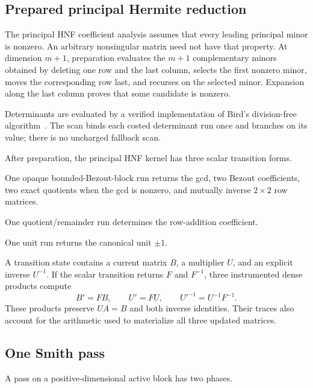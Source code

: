 \documentclass[11pt]{article}
\theoremstyle{definition}
\begin{document}
\subsection{Prepared principal Hermite reduction}

The principal HNF coefficient analysis assumes that every leading principal minor is nonzero.  An arbitrary nonsingular matrix need not have that property.  At dimension $m+1$, preparation evaluates the $m+1$ complementary minors obtained by deleting one row and the last column, selects the first nonzero minor, moves the corresponding row last, and recurses on the selected minor.  Expansion along the last column proves that some candidate is nonzero.

Determinants are evaluated by a verified implementation of Bird's division-free algorithm~\cite{bird2011}.  The scan binds each costed determinant run once and branches on its value; there is no uncharged fallback scan.

After preparation, the principal HNF kernel has three scalar transition forms.

\begin{description}[style=nextline,leftmargin=1.5em]
  \item[Bezout elimination.] One opaque bounded-Bezout-block run returns the gcd, two Bezout coefficients, two exact quotients when the gcd is nonzero, and mutually inverse $2\times2$ row matrices.

  \item[Reduction above a pivot.] One quotient/remainder run determines the row-addition coefficient.

  \item[Normalization.] One unit run returns the canonical unit $\pm1$.
\end{description}

A transition state contains a current matrix $B$, a multiplier $U$, and an explicit inverse $U^{-1}$.  If the scalar transition returns $F$ and $F^{-1}$, three instrumented dense products compute
\[
  B'=FB,\qquad U'=FU,\qquad U'^{-1}=U^{-1}F^{-1}.
\]
These products preserve $UA=B$ and both inverse identities.  Their traces also account for the arithmetic used to materialize all three updated matrices.

\subsection{One Smith pass}

A pass on a positive-dimensional active block has two phases.
\end{document}
